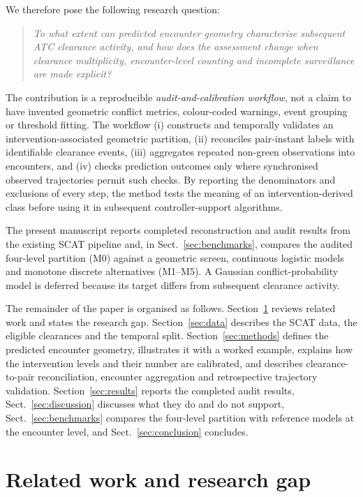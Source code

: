 \documentclass[pdflatex,sn-mathphys-num]{sn-jnl}
\begin{document}
We therefore pose the following research question:
\begin{quote}
\emph{To what extent can predicted encounter geometry characterise subsequent ATC clearance activity, and how does the assessment change when clearance multiplicity, encounter-level counting and incomplete surveillance are made explicit?}
\end{quote}

The contribution is a reproducible \emph{audit-and-calibration workflow}, not a claim to have invented geometric conflict metrics, colour-coded warnings, event grouping or threshold fitting. The workflow (i) constructs and temporally validates an intervention-associated geometric partition, (ii) reconciles pair-instant labels with identifiable clearance events, (iii) aggregates repeated non-green observations into encounters, and (iv) checks prediction outcomes only where synchronised observed trajectories permit such checks. By reporting the denominators and exclusions of every step, the method tests the meaning of an intervention-derived class before using it in subsequent controller-support algorithms.

The present manuscript reports completed reconstruction and audit results from the existing SCAT pipeline and, in Sect.~\ref{sec:benchmarks}, compares the audited four-level partition (M0) against a geometric screen, continuous logistic models and monotone discrete alternatives (M1--M5). A Gaussian conflict-probability model is deferred because its target differs from subsequent clearance activity.

The remainder of the paper is organised as follows. Section~\ref{sec:related} reviews related work and states the research gap. Section~\ref{sec:data} describes the SCAT data, the eligible clearances and the temporal split. Section~\ref{sec:methods} defines the predicted encounter geometry, illustrates it with a worked example, explains how the intervention levels and their number are calibrated, and describes clearance-to-pair reconciliation, encounter aggregation and retrospective trajectory validation. Section~\ref{sec:results} reports the completed audit results, Sect.~\ref{sec:discussion} discusses what they do and do not support, Sect.~\ref{sec:benchmarks} compares the four-level partition with reference models at the encounter level, and Sect.~\ref{sec:conclusion} concludes.

\section{Related work and research gap}\label{sec:related}
\end{document}
